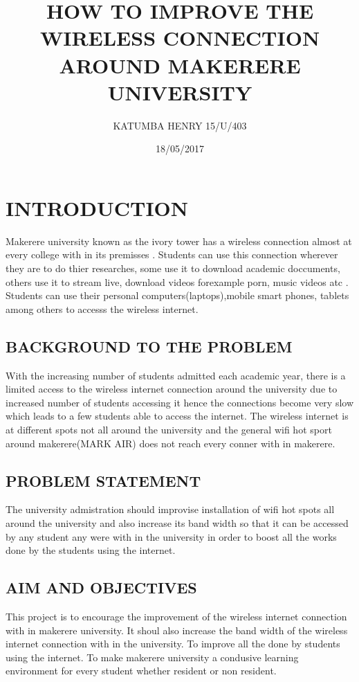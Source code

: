 \documentclass{article}
\title{HOW TO IMPROVE THE WIRELESS CONNECTION AROUND MAKERERE UNIVERSITY}
\author{ KATUMBA HENRY  15/U/403}
\date{18/05/2017}
\begin{document}
  \maketitle
 
  
  \section{INTRODUCTION}
Makerere university known as the ivory tower has a wireless connection almost at every college with in its premisses .
Students can use this connection wherever they are to do thier researches, some use it to download academic doccuments, others use it to stream live, download videos forexample porn, music videos atc . 
Students can use their personal computers(laptops),mobile smart phones, tablets among others to accesss the wireless internet.
      	\subsection{ BACKGROUND TO THE PROBLEM}
With the increasing number of students admitted each academic year, there is a limited access to the wireless internet  connection around the university due to increased number of students accessing it hence the connections become very slow  which leads to a few students able to access the internet.
 The wireless internet is at different spots not all around the university and the general wifi hot sport around makerere(MARK AIR) does not reach every conner with in makerere.
	\subsection{ PROBLEM STATEMENT}
The university admistration should improvise installation of wifi hot spots all around the university  and also increase its band width so that it can be accessed by any student any were with in the university in order  to boost all the works done by the students using the internet.

	\subsection{AIM AND OBJECTIVES}
This project is to encourage the improvement of the wireless internet connection with in makerere university.
It shoul also increase the band width of the wireless internet connection with in the university. 
To improve all the done by students using the internet.
To make makerere university a condusive learning environment for every student whether resident or non resident.
\end{document}
